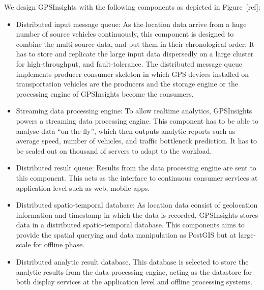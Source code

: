 \documentclass{acm_proc_article-sp}
\begin{document}

We design GPSInsights with the following components as depicted  in Figure~[ref]:

\begin{itemize}
\item 	Distributed input message queue: As the location data arrive from a huge number of source vehicles continuously, this component is designed to combine the multi-source data, and put them in their chronological order. It has to store and replicate the large input data dispersedly on a large cluster for high-throughput, and fault-tolerance. The distributed message queue implements producer-consumer skeleton in which GPS devices installed on transportation vehicles are the producers and the storage engine or the processing engine of GPSInsights become the consumers.

\item  Streaming data processing engine: To allow realtime analytics, GPSInsights powers a streaming data processing engine. This component has to be able to analyse data ``on the fly'', which then outputs analytic reports such as average speed, number of vehicles, and traffic bottleneck prediction. It has to be scaled out on thousand of servers to adapt to the workload.

\item  Distributed result queue: Results from the data processing engine are sent to this component. This acts as the interface to continuous consumer services at application level such as web, mobile apps. 

\item  Distributed spatio-temporal database: As location data consist of geolocation information and timestamp in which the data is recorded, GPSInsights stores data in a distributed spatio-temporal database. This components aims to provide the spatial querying and data manipulation as PostGIS but at large-scale for offline phase. 

\item  Distributed analytic result database. This database is selected to store the analytic results from the data processing engine, acting as the datastore for both display services at the application level and offline processing systems. 

\end{itemize}
\end{document}
